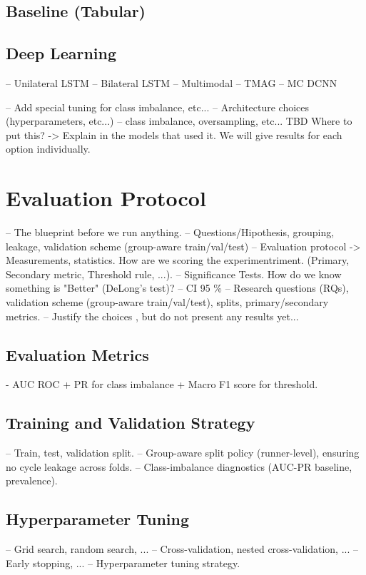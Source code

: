 \subsection{Baseline (Tabular)}\label{subsec:method-baselines}
\subsection{Deep Learning}\label{subsec:method-deep-learning}
-- Unilateral LSTM
-- Bilateral LSTM
-- Multimodal
-- TMAG
-- MC DCNN

-- Add special tuning for class imbalance, etc...
-- Architecture choices (hyperparameters, etc...)
-- class imbalance, oversampling, etc... TBD Where to put this? -> Explain in the models that used it. We will give results for each option individually.

\section{Evaluation Protocol}\label{sec:method-evaluation-protocol}
-- The blueprint before we run anything.
-- Questions/Hipothesis, grouping, leakage, validation scheme (group-aware train/val/test)
-- Evaluation protocol -> Measurements, statistics. How are we scoring the experimentriment. (Primary, Secondary metric, Threshold rule, ...).
-- Significance Tests. How do we know something is "Better" (DeLong's test)?
-- CI 95 \%
-- Research questions (RQs), validation scheme (group-aware train/val/test), splits, primary/secondary metrics.
-- Justify the choices , but do not present any results yet...

\subsection{Evaluation Metrics}\label{subsec:method-evaluation-metrics}
- AUC ROC + PR for class imbalance + Macro F1 score for threshold.

\subsection{Training and Validation Strategy}\label{subsec:method-training-validation-strategy}
-- Train, test, validation split.
-- Group-aware split policy (runner-level), ensuring no cycle leakage across folds.
-- Class-imbalance diagnostics (AUC-PR baseline, prevalence).

\subsection{Hyperparameter Tuning}\label{subsec:method-hyperparameter-tuning}
-- Grid search, random search, ...
-- Cross-validation, nested cross-validation, ...
-- Early stopping, ...
-- Hyperparameter tuning strategy.


